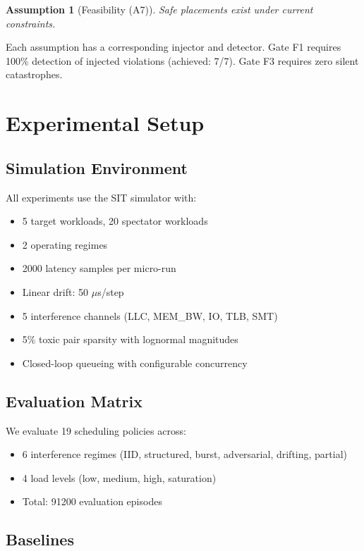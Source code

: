 \documentclass[11pt,twocolumn]{article}
\newtheorem{assumption}{Assumption}
\begin{document}
\begin{assumption}[Feasibility (A7)]
Safe placements exist under current constraints.
\end{assumption}

Each assumption has a corresponding injector and detector. Gate F1
requires 100\% detection of injected violations (achieved: 7/7).
Gate F3 requires zero silent catastrophes.

\section{Experimental Setup}
\label{sec:setup}

\subsection{Simulation Environment}

All experiments use the SIT simulator with:
\begin{itemize}
\item 5 target workloads, 20 spectator workloads
\item 2 operating regimes
\item 2000 latency samples per micro-run
\item Linear drift: 50 $\mu$s/step
\item 5 interference channels (LLC, MEM\_BW, IO, TLB, SMT)
\item 5\% toxic pair sparsity with lognormal magnitudes
\item Closed-loop queueing with configurable concurrency
\end{itemize}

\subsection{Evaluation Matrix}

We evaluate 19 scheduling policies across:
\begin{itemize}
\item 6 interference regimes (IID, structured, burst, adversarial, drifting, partial)
\item 4 load levels (low, medium, high, saturation)
\item Total: 91200 evaluation episodes
\end{itemize}

\subsection{Baselines}
\end{document}
